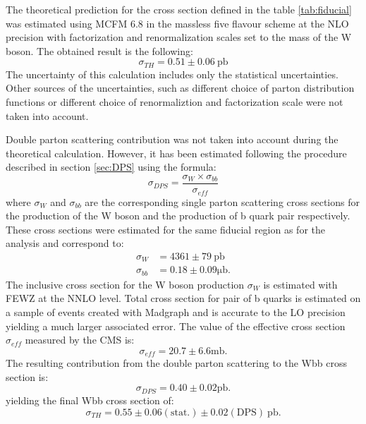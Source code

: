 The theoretical prediction for the cross section defined in the table \ref{tab:fiducial} was estimated using MCFM 6.8 in the massless five flavour scheme at the NLO precision with factorization and renormalization scales set to the mass of the W boson. The obtained result is the following:
\begin{equation*}
\sigma_{TH}=0.51\pm 0.06 \mathrm{\ pb}
\end{equation*} 
The uncertainty of this calculation includes only the statistical uncertainties. Other sources of the uncertainties, such as different choice of parton distribution functions or different choice of renormaliztion and factorization scale were not taken into account. 
\par Double parton scattering contribution was not taken into account during the theoretical calculation. However, it has been estimated following the procedure described in section \ref{sec:DPS} using the formula:
\begin{equation}
\sigma_{DPS} = \frac{\sigma_W \times \sigma_{bb}}{\sigma_{eff}}
\end{equation}
where $\sigma_W$ and $\sigma_{bb}$ are the corresponding single parton scattering cross sections for the production of the W boson and the production of b quark pair respectively. These cross sections were estimated for the same fiducial region as for the analysis and correspond to:
\begin{align*}
\sigma_{W} &= 4361 \pm 79 \mathrm{\ pb} \\
\sigma_{bb} &= 0.18 \pm 0.09 \mathrm{\mu b}.
\end{align*}
The inclusive cross section for the W boson production $\sigma_W$ is estimated with FEWZ \cite{Gavin:2012sy} at the NNLO level. Total cross section for pair of b quarks is estimated on a sample of events created with Madgraph and is accurate to the LO precision yielding a much larger associated error. The value of the effective cross section $\sigma_{eff}$ measured by the CMS is:
\begin{equation*}
\sigma_{eff}=20.7 \pm 6.6 \mathrm{mb}.
\end{equation*}   
The resulting contribution from the double parton scattering to the Wbb cross section is:
\begin{equation*}
\sigma_{DPS}=0.40 \pm 0.02 \mathrm{pb}.
\end{equation*}
yielding the final Wbb cross section of:
\begin{equation*}
\sigma_{TH} = 0.55 \pm 0.06 \mathrm{(stat.)} \pm 0.02 \mathrm{(DPS)} \mathrm{\ pb}.
\end{equation*}

